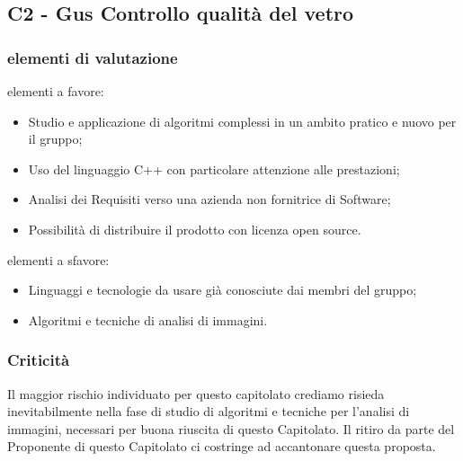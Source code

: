 \subsection{C2 - Gus Controllo qualità del vetro}{
	\subsubsection{elementi di valutazione}{
		elementi a favore:
		\begin{itemize}
			\item Studio e applicazione di algoritmi complessi in un ambito pratico e nuovo per il gruppo;
			\item Uso del linguaggio C++ con particolare attenzione alle prestazioni;
			\item Analisi dei Requisiti verso una azienda non fornitrice di Software;
			\item Possibilità di distribuire il prodotto con licenza open source.
		\end{itemize}
		
		elementi a sfavore:
		\begin{itemize}
			\item Linguaggi e tecnologie da usare già conosciute dai membri del gruppo;
			\item Algoritmi e tecniche di analisi di immagini.
		\end{itemize}
	}
	\subsubsection{Criticità}{
		Il maggior rischio individuato per questo capitolato crediamo risieda inevitabilmente nella fase di studio di algoritmi e tecniche per l'analisi di immagini, necessari per buona riuscita di questo Capitolato.
		Il ritiro da parte del Proponente di questo Capitolato ci costringe ad accantonare questa proposta.
	}
}
